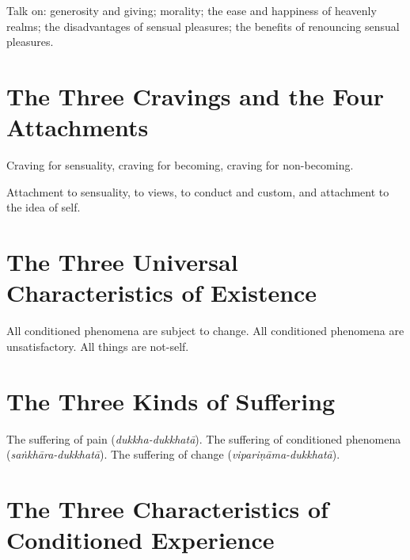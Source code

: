Talk on: generosity and giving; morality; the ease and happiness of heavenly
realms; the disadvantages of sensual pleasures; the benefits of renouncing
sensual pleasures.


\ifhandbookedition
\vspace*{-\baselineskip}
\fi

\section*{The Three Cravings and the Four Attachments}

Craving for sensuality, craving for becoming, craving for non-becoming.

Attachment to sensuality, to views, to conduct and custom, and attachment to the
idea of self.


\ifhandbookedition
\vspace*{-\baselineskip}
\fi

\section*{The Three Universal Characteristics of Existence}

All conditioned phenomena are subject to change.
All conditioned phenomena are unsatisfactory.
All things are not-self.


\ifhandbookedition
\vspace*{-\baselineskip}
\fi

\section*{The Three Kinds of Suffering}

The suffering of pain (\emph{dukkha-dukkhatā}).
The suffering of conditioned phenomena (\emph{saṅkhāra-dukkhatā}).
The suffering of change (\emph{vipariṇāma-dukkhatā}).


\ifhandbookedition
\vspace*{-\baselineskip}
\fi

\section*{The Three Characteristics of Conditioned Experience}

